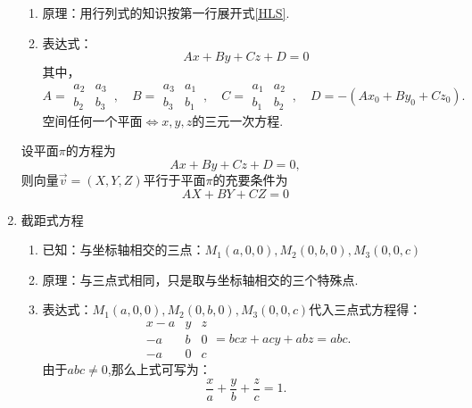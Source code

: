 \begin{enumerate}[\large1.]
\begin{enumerate}[]
		\item 原理：用行列式的知识按第一行展开式\eqref{HLS}.
		\item 表达式：
		\begin{equation}
		Ax+By+Cz+D=0
		\end{equation}
		其中，
		\begin{equation*}
		A=\begin{array}{|cc|}
		a_2 & a_3 \\
		b_2 & b_3
		\end{array}
		\,,\quad 
		B=\begin{array}{|cc|}
		a_3 & a_1 \\
		b_3 & b_1
		\end{array}
		\,,\quad 
		C=\begin{array}{|cc|}
		a_1 & a_2 \\
		b_1 & b_2
		\end{array}
		\,,\quad 
		D=-(Ax_0+By_0+Cz_0).
		\end{equation*}
		{\color{dy}空间任何一个平面$\Longleftrightarrow x,y,z$的三元一次方程. }
	\end{enumerate}
	
	\enbelowtheorem[向量与平面平行定理]
	\quad 设平面$\pi $的方程为
	\begin{equation*}
	Ax+By+Cz+D=0,
	\end{equation*}
	则向量$\overrightarrow{v}=(X,Y,Z)$平行于平面$\pi $的充要条件为
	\begin{equation*}
	AX+BY+CZ=0
	\end{equation*}
	
	\item {\color{dy}\large 截距式方程}
	\begin{enumerate}[]
		\item 已知：{\color{dl}与坐标轴相交的三点}：$M_1(a,0,0),M_2(0,b,0),M_3(0,0,c)$
		\item 原理：与三点式相同，只是取与坐标轴相交的三个特殊点. 
		\item 表达式：$M_1(a,0,0),M_2(0,b,0),M_3(0,0,c)$代入三点式方程得：
		\begin{equation*}
		\begin{array}{|ccc|}
		x-a & y & z \\
		-a & b & 0 \\
		-a & 0 & c
		\end{array}=bcx+acy+abz=abc.
		\end{equation*}
		由于$abc \ne 0$,那么上式可写为：
		\begin{equation}
		\frac{x}{a}+\frac{y}{b}+\frac{z}{c}=1.
		\end{equation}
	\end{enumerate}
\end{enumerate}
